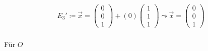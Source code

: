 \begin{gather}
E_3'\coloneqq \vec{x} = \begin{pmatrix}
0\\0\\1
\end{pmatrix}+(0) \begin{pmatrix}
1\\1\\1
\end{pmatrix} 
\leadsto \vec{x} =
\begin{pmatrix}
0\\0\\1
\end{pmatrix}
\end{gather}\\


Für \ensuremath{O}  %

